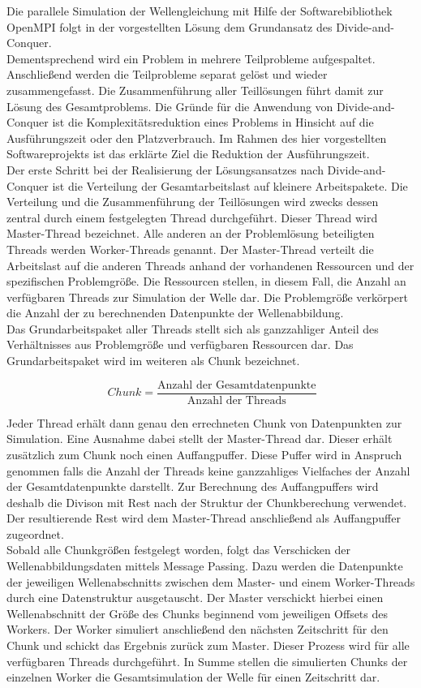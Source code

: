 Die parallele Simulation der Wellengleichung mit Hilfe der Softwarebibliothek OpenMPI folgt in der vorgestellten Lösung dem Grundansatz des Divide-and-Conquer.\\
Dementsprechend wird ein Problem in mehrere Teilprobleme aufgespaltet. Anschließend werden die Teilprobleme separat gelöst und wieder zusammengefasst. Die Zusammenführung aller Teillösungen führt damit zur Lösung des Gesamtproblems. Die Gründe für die Anwendung von Divide-and-Conquer ist die Komplexitätsreduktion eines Problems in Hinsicht auf die Ausführungszeit oder den Platzverbrauch. Im Rahmen des hier vorgestellten Softwareprojekts ist das erklärte Ziel die Reduktion der Ausführungszeit.\\
Der erste Schritt bei der Realisierung der Lösungsansatzes nach Divide-and-Conquer ist die Verteilung der Gesamtarbeitslast auf kleinere Arbeitspakete. Die Verteilung und die Zusammenführung der Teillösungen wird zwecks dessen zentral durch einem festgelegten Thread durchgeführt. Dieser Thread wird Master-Thread bezeichnet. Alle anderen an der Problemlösung beteiligten Threads werden Worker-Threads genannt. Der Master-Thread verteilt die Arbeitslast auf die anderen Threads anhand der vorhandenen Ressourcen und der spezifischen Problemgröße. Die Ressourcen stellen, in diesem Fall, die Anzahl an verfügbaren Threads zur Simulation der Welle dar. Die Problemgröße verkörpert die Anzahl der zu berechnenden Datenpunkte der Wellenabbildung.\\
Das Grundarbeitspaket aller Threads stellt sich als ganzzahliger Anteil des Verhältnisses aus Problemgröße und verfügbaren Ressourcen dar. Das Grundarbeitspaket wird im weiteren als Chunk bezeichnet.

\begin{equation}
\ Chunk = \frac{\text{Anzahl der Gesamtdatenpunkte}}{\text{Anzahl der Threads}}
\end{equation}

Jeder Thread erhält dann genau den errechneten Chunk von Datenpunkten zur Simulation. Eine Ausnahme dabei stellt der Master-Thread dar. Dieser erhält zusätzlich zum Chunk noch einen Auffangpuffer. Diese Puffer wird in Anspruch genommen falls die Anzahl der Threads keine ganzzahliges Vielfaches der Anzahl der Gesamtdatenpunkte darstellt. Zur Berechnung des Auffangpuffers wird deshalb die Divison mit Rest nach der Struktur der Chunkberechung verwendet. Der resultierende Rest wird dem Master-Thread anschließend als Auffangpuffer zugeordnet.\\
Sobald alle Chunkgrößen festgelegt worden, folgt das Verschicken der Wellenabbildungsdaten mittels Message Passing. Dazu werden die Datenpunkte der jeweiligen Wellenabschnitts zwischen dem Master- und einem Worker-Threads durch eine Datenstruktur ausgetauscht. Der Master verschickt hierbei einen Wellenabschnitt der Größe des Chunks beginnend vom jeweiligen Offsets des Workers. Der Worker simuliert anschließend den nächsten Zeitschritt für den Chunk und schickt das Ergebnis zurück zum Master. Dieser Prozess wird für alle verfügbaren Threads durchgeführt. In Summe stellen die simulierten Chunks der einzelnen Worker die Gesamtsimulation der Welle für einen Zeitschritt dar.\\

